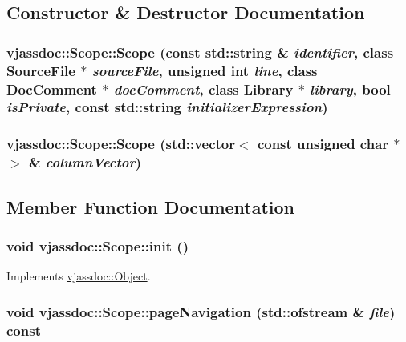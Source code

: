 \subsection{Constructor \& Destructor Documentation}
\hypertarget{classvjassdoc_1_1Scope_93e1a8c864401dcb118123b8c1c862d8}{
\subsubsection{\setlength{\rightskip}{0pt plus 5cm}vjassdoc::Scope::Scope (const std::string \& {\em identifier}, class {\bf SourceFile} $\ast$ {\em sourceFile}, unsigned int {\em line}, class {\bf DocComment} $\ast$ {\em docComment}, class {\bf Library} $\ast$ {\em library}, bool {\em isPrivate}, const std::string {\em initializerExpression})}}
\label{classvjassdoc_1_1Scope_93e1a8c864401dcb118123b8c1c862d8}


\hypertarget{classvjassdoc_1_1Scope_08fa49b1daca27363032265465005dc0}{
\subsubsection{\setlength{\rightskip}{0pt plus 5cm}vjassdoc::Scope::Scope (std::vector$<$ const unsigned char $\ast$ $>$ \& {\em columnVector})}}
\label{classvjassdoc_1_1Scope_08fa49b1daca27363032265465005dc0}




\subsection{Member Function Documentation}
\hypertarget{classvjassdoc_1_1Scope_fb5915ecd0cabc72508e7b7a09f0ef5c}{
\subsubsection{\setlength{\rightskip}{0pt plus 5cm}void vjassdoc::Scope::init ()}}
\label{classvjassdoc_1_1Scope_fb5915ecd0cabc72508e7b7a09f0ef5c}




Implements \hyperlink{classvjassdoc_1_1Object_bd43e77dbe80055f5adda67661dfaca4}{vjassdoc::Object}.\hypertarget{classvjassdoc_1_1Scope_3fac1b4e0201e20463acfc5f0f0e93b8}{
\subsubsection{\setlength{\rightskip}{0pt plus 5cm}void vjassdoc::Scope::pageNavigation (std::ofstream \& {\em file}) const}}
\label{classvjassdoc_1_1Scope_3fac1b4e0201e20463acfc5f0f0e93b8}




